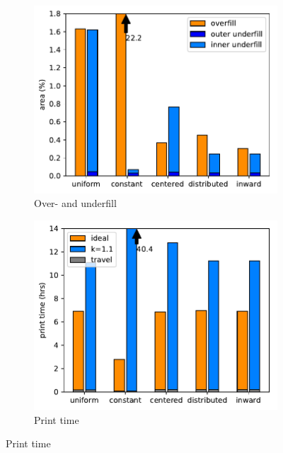 \begin{figure}
\centering
\setlength{\figheight}{0.25\textwidth}
\setlength{\figwidth}{0.32\textwidth}
\begin{subfigure}{\figwidth}\centering
\includegraphics[height=\figheight]{sources-validation-over-underfill.pdf}
\caption{{Over- and underfill}}
\label{over_underfill}
\end{subfigure}
\begin{subfigure}{\figwidth}\centering
\includegraphics[height=\figheight]{sources-validation-print-time.pdf}
\caption{{Print time}}

\end{subfigure}
\end{figure}
